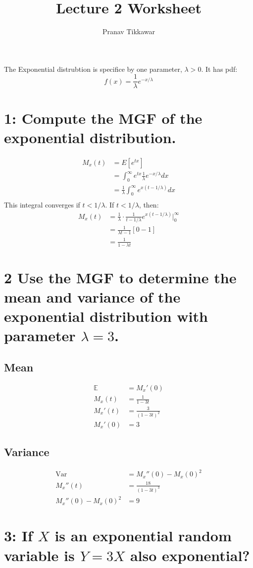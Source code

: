 \documentclass{article}
\author{Pranav Tikkawar}
\title{Lecture 2 Worksheet}
\begin{document}
\maketitle
The Exponential distrubtion is specifice by one parameter, $\lambda > 0$. It has pdf: $$f(x) = \frac{1}{\lambda} e^{-x/\lambda}$$
\section*{1: Compute the MGF of the exponential distribution.}
\begin{align*}
M_x(t) &= E[e^{tx}]\\
&= \int_{0}^{\infty} e^{tx} \frac{1}{\lambda} e^{-x/\lambda} dx\\
&= \frac{1}{\lambda} \int_{0}^{\infty} e^{x(t-1/\lambda)} dx\\
\end{align*}
This integral converges if $t < 1/\lambda$. If $t < 1/\lambda$, then:
\begin{align*}
M_x(t) &= \frac{1}{\lambda} \cdot \frac{1}{t-1/\lambda} e^{x(t-1/\lambda)} \Big|_{0}^{\infty}\\
&= \frac{1}{\lambda t -1} [0 - 1]\\
&= \frac{1}{1-\lambda t}
\end{align*}
\section*{2 Use the MGF to determine the mean and variance of the exponential distribution with parameter $\lambda = 3$.}
\subsection*{Mean}
\begin{align*}
\mathds{E} &= M_x'(0)\\
M_x(t) &= \frac{1}{1-3t}\\
M_x'(t) &= \frac{3}{(1-3t)^2}\\
M_x'(0) &= 3
\end{align*}
\subsection*{Variance}
\begin{align*}
\text{Var} &= M_x''(0) - M_x(0)^2\\
M_x''(t) &= \frac{18}{(1-3t)^3}\\
M_x''(0) - M_x(0)^2 &= 9
\end{align*}

\section*{3: If $X$ is an exponential random variable is $Y = 3X$ also exponential?}
\end{document}
